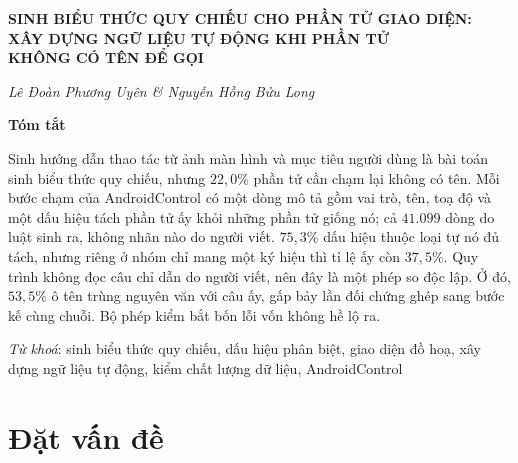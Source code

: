 \documentclass[12pt,a4paper,onecolumn]{article}
\newcommand{\ôvuông}[2]{\tikz[baseline=-0.45ex]{\draw[#1,line width=0.9pt,#2] (0,0) rectangle (0.34,0.18);}}
\begin{document}
\begin{center}
{\fontsize{14}{17}\selectfont\bfseries
SINH BIỂU THỨC QUY CHIẾU CHO PHẦN TỬ GIAO DIỆN:\\
XÂY DỰNG NGỮ LIỆU TỰ ĐỘNG KHI PHẦN TỬ\\
KHÔNG CÓ TÊN ĐỂ GỌI\par}
\vspace{8pt}
{\itshape Lê Đoàn Phương Uyên \& Nguyễn Hồng Bửu Long\par}
\end{center}
\vspace{6pt}

{\noindent\bfseries Tóm tắt\par}
{\noindent
Sinh hướng dẫn thao tác từ ảnh màn hình và mục tiêu người dùng là bài toán sinh biểu
thức quy chiếu, nhưng $22{,}0\%$ phần tử cần chạm lại không có tên. Mỗi bước chạm của
AndroidControl có một dòng mô tả gồm vai trò, tên, toạ độ và một dấu hiệu tách phần tử
ấy khỏi những phần tử giống nó; cả $41.099$ dòng do luật sinh ra, không nhãn nào do
người viết. $75{,}3\%$ dấu hiệu thuộc loại tự nó đủ tách, nhưng riêng ở nhóm chỉ mang
một ký hiệu thì tỉ lệ ấy còn $37{,}5\%$. Quy trình không đọc câu chỉ dẫn do người viết,
nên đây là một phép so độc lập. Ở đó, $53{,}5\%$ ô tên trùng nguyên văn với câu ấy, gấp
bảy lần đối chứng ghép sang bước kế cùng chuỗi. Bộ phép kiểm bắt bốn lỗi vốn không hề lộ ra.
\par}

{\hspace*{36pt}\textit{Từ khoá}: sinh biểu thức quy chiếu, dấu hiệu phân
biệt, giao diện đồ hoạ, xây dựng ngữ liệu tự động, kiểm chất lượng dữ liệu,
AndroidControl\par}
\vspace{6pt}

\section{Đặt vấn đề}
\label{sec:datvande}
\end{document}
